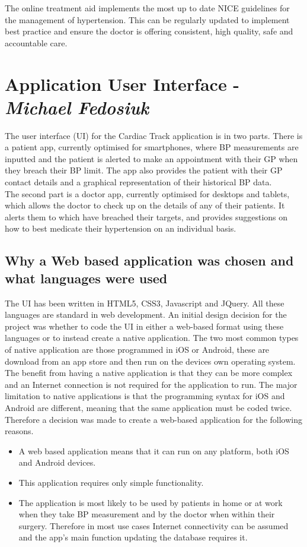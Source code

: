 \documentclass[11pt]{article}
\begin{document}
The online treatment aid implements the most up to date NICE guidelines for the management of hypertension. This can be regularly updated to implement best practice and ensure the doctor is offering consistent, high quality, safe and accountable care.


\section{Application User Interface - \textit{Michael Fedosiuk}}
The user interface (UI) for the Cardiac Track application is in two parts. There is a patient app, currently optimised for smartphones, where BP measurements are inputted and the patient is alerted to make an appointment with their GP when they breach their BP limit. The app also provides the patient with their GP contact details and a graphical representation of their historical BP data.
\\ \indent
The second part is a doctor app, currently optimised for desktops and tablets, which allows the doctor to check up on the details of any of their patients. It alerts them to which have breached their targets, and provides suggestions on how to best medicate their hypertension on an individual basis. 

\subsection{Why a Web based application was chosen and what languages were used}
The UI has been written in HTML5, CSS3, Javascript and JQuery. All these languages are standard in web development. An initial design decision for the project was whether to code the UI in either a web-based format using these languages or to instead create a native application. The two most common types of native application are those programmed in iOS or Android, these are download from an app store and then run on the devices own operating system. The benefit from having a native application is that they can be more complex and an Internet connection is not required for the application to run. The major limitation to native applications is that the programming syntax for iOS and Android are different, meaning that the same application must be coded twice. Therefore a decision was made to create a web-based application for the following reasons.
\begin{itemize}
\item 
A web based application means that it can run on any platform, both iOS and Android devices.
\item
This application requires only simple functionality.
\item
The application is most likely to be used by patients in home or at work when they take BP measurement and by the doctor when within their surgery. Therefore in most use cases Internet connectivity can be assumed and the app's main function updating the database requires it.
\end{itemize}
\end{document}
